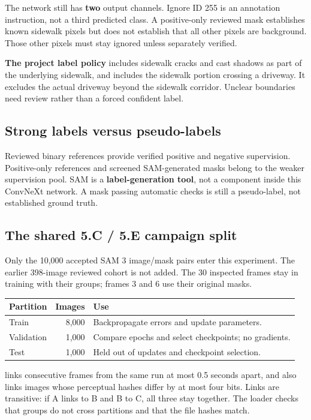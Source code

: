 \documentclass[11pt,letterpaper]{article}
\newcommand{\code}[1]{\texttt{\detokenize{#1}}}
\begin{document}
The network still has \textbf{two} output channels. Ignore ID 255 is an annotation instruction, not a third predicted class. A positive-only reviewed mask establishes known sidewalk pixels but does not establish that all other pixels are background. Those other pixels must stay ignored unless separately verified.

\textbf{The project label policy} includes sidewalk cracks and cast shadows as part of the underlying sidewalk, and includes the sidewalk portion crossing a driveway. It excludes the actual driveway beyond the sidewalk corridor. Unclear boundaries need review rather than a forced confident label.

\subsection*{Strong labels versus pseudo-labels}
Reviewed binary references provide verified positive and negative supervision. Positive-only references and screened SAM-generated masks belong to the weaker supervision pool. SAM is a \textbf{label-generation tool}, not a component inside this ConvNeXt network. A mask passing automatic checks is still a pseudo-label, not established ground truth.

\subsection*{The shared 5.C / 5.E campaign split}
Only the 10,000 accepted SAM 3 image/mask pairs enter this experiment. The earlier 398-image reviewed cohort is not added. The 30 inspected frames stay in training with their groups; frames 3 and 6 use their original masks.

\begin{tabularx}{\linewidth}{@{}lrY@{}}\toprule
Partition & Images & Use\\\midrule
Train & 8,000 & Backpropagate errors and update parameters.\\
Validation & 1,000 & Compare epochs and select checkpoints; no gradients.\\
Test & 1,000 & Held out of updates and checkpoint selection.\\\bottomrule
\end{tabularx}

\code{campaign10k.py} links consecutive frames from the same run at most 0.5 seconds apart, and also links images whose perceptual hashes differ by at most four bits. Links are transitive: if A links to B and B to C, all three stay together. The loader checks that groups do not cross partitions and that the file hashes match.
\end{document}
